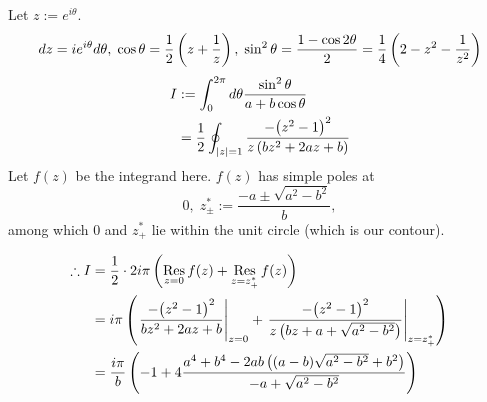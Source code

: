 \item

Let $z := e^{i\theta}$.
\[
	dz = ie^{i\theta} d\theta,\;
	\cos\theta = \frac{1}{2}\left( z + \frac{1}{z} \right),\;
	\sin^2 \theta = \frac{1 - \cos 2\theta}{2} = \frac{1}{4}\left( 2 - z^2 - \frac{1}{z^2} \right)
\]
\begin{align*}
	I
    &:= \int_0^{2\pi} d\theta \frac{\sin^2 \theta}{a + b\cos\theta} \\
    &= \frac{1}{2} \oint_{\left| z \right| = 1} \frac{
        -{\left( z^2 - 1 \right)}^2
    }{
        z \left( bz^2 + 2az + b \right)
    }
\end{align*}
Let $f(z)$ be the integrand here.
$f(z)$ has simple poles at
\[
    0,\; z^*_\pm := \frac{-a \pm \sqrt{a^2 - b^2}}{b},
\]
among which $0$ and $z^*_+$ lie within the unit circle (which is our contour).

\begin{align*}
    \therefore I
    &= \frac{1}{2} \cdot 2i\pi \left( \mathop{\mathrm{Res}}_{z = 0} f(z) + \mathop{\mathrm{Res}}_{z = z^*_+} f(z) \right) \\
    &= i\pi \left(
        {\left. 
            \frac{-{\left( z^2 - 1 \right)}^2}{bz^2 + 2az + b}
         \right|}_{z = 0} + {\left.  
            \frac{-{\left( z^2 - 1 \right)}^2}{z \left( bz + a + \sqrt{a^2 - b^2} \right)}
         \right|}_{z = z^*_+}
    \right) \\
    &= \frac{i\pi}{b} \left(
        -1 + 4\frac{
            a^4 + b^4 - 2ab\left( (a-b)\sqrt{a^2 - b^2} + b^2 \right)
        }{
            -a + \sqrt{a^2 - b^2}
        }
    \right)
\end{align*}
